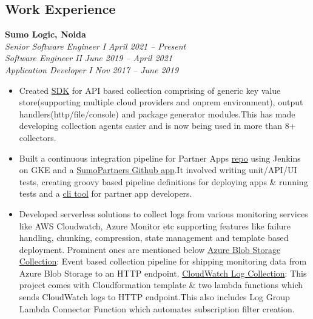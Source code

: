 \documentclass[margin,line]{resume}
\begin{document}
\begin{resume}
    \section{\mysidestyle Work Experience}
    \textbf{Sumo Logic, Noida}\\
        \textsl{Senior Software Engineer I} \hfill \textsl{April 2021 -- Present}\vspace{0mm}\\\vspace{0mm}%
        \textsl{Software Engineer II} \hfill \textsl{June 2019 -- April 2021}\vspace{0mm}\\\vspace{0mm}%
        \textsl{Application Developer I} \hfill \textsl{Nov 2017 -- June 2019}\vspace{1mm}%
        \begin{itemize}
            \item Created \href{https://pypi.org/project/sumologic-appclient-sdk/}{SDK} for API based collection comprising of generic key value store(supporting multiple cloud providers and onprem environment), output handlers(http/file/console) and package generator modules.This has made developing collection agents easier and is now being used in more than 8+ collectors.
            \item Built a continuous integration pipeline for Partner Apps \href{https://github.com/SumoLogic/sumologic-public-partner-apps}{repo} using Jenkins on GKE and a  \href{https://github.com/apps/sumopartners}{SumoPartners Github app}.It involved writing unit/API/UI tests, creating groovy based pipeline definitions for deploying apps \& running tests and a \href{https://pypi.org/project/sumologic-apptestutils/}{cli tool} for partner app developers.
            \item Developed serverless solutions to collect logs from various monitoring services like AWS Cloudwatch, Azure Monitor etc supporting features like failure handling, chunking, compression, state management and template based deployment. Prominent ones are mentioned below 
            \subitem \href{https://help.sumologic.com/Send-Data/Collect-from-Other-Data-Sources/Azure_Blob_Storage}{Azure Blob Storage Collection}: Event based collection pipeline for shipping monitoring
data from Azure Blob Storage to an HTTP endpoint.
            \subitem \href{https://help.sumologic.com/Send-Data/Collect-from-Other-Data-Sources/Amazon-CloudWatch-Logs}{CloudWatch Log Collection}: This project comes with Cloudformation template \& two lambda functions which sends CloudWatch logs to HTTP endpoint.This also includes Log Group Lambda Connector Function which automates subscription filter creation.

\end{itemize}
\end{resume}
\end{document}
